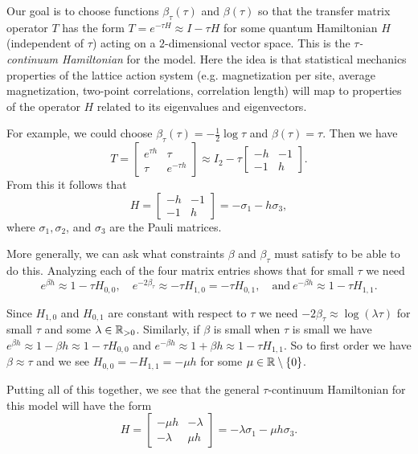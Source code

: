 \documentclass[11pt,reqno]{amsart}
\begin{document}
	Our goal is to choose functions $\beta_\tau(\tau)$ and $\beta(\tau)$ so that the transfer matrix operator $T$ has the form $T=e^{-\tau H} \approx I-\tau H$ for some quantum Hamiltonian $H$ (independent of $\tau$) acting on a $2$-dimensional vector space. 
	This is the \emph{$\tau$-continuum Hamiltonian} for the model. 
	Here the idea is that statistical mechanics properties of the lattice action system (e.g. magnetization per site, average magnetization, two-point correlations, correlation length) will map to properties of the operator $H$ related to its eigenvalues and eigenvectors.
	
	For example, we could choose $\beta_\tau(\tau)=-\frac{1}{2}\log \tau$ and $\beta(\tau)=\tau$. Then we have \[T=\begin{bmatrix}
	e^{\tau h} & \tau \\
	\tau & e^{-\tau h}
	\end{bmatrix} \approx I_2-\tau\begin{bmatrix}
	-h & -1 \\
	-1 & h
	\end{bmatrix}.\] 
	From this it follows that \[H=\begin{bmatrix}
	-h & -1 \\
	-1 & h
	\end{bmatrix}=-\sigma_1-h\sigma_3, \] where $\sigma_1,\sigma_2$, and $\sigma_3$ are the Pauli matrices. 
	
	More generally, we can ask what constraints $\beta$ and $\beta_\tau$ must satisfy to be able to do this. 
	Analyzing each of the four matrix entries shows that for small $\tau$ we need 
	\[e^{\beta h} \approx 1-\tau H_{0,0}, \quad e^{-2\beta_\tau} \approx -\tau H_{1,0}=-\tau H_{0,1},\quad \text{and} \ e^{-\beta h} \approx 1- \tau H_{1,1}. \]
	
	Since $H_{1,0}$ and $H_{0,1}$ are constant with respect to $\tau$ we need $-2\beta_\tau \approx \log (\lambda\tau)$ for small $\tau$ and some $\lambda\in \mathbb{R}_{>0}$. 
	Similarly, if $\beta$ is small when $\tau$ is small we have $e^{\beta h} \approx 1-\beta h \approx 1-\tau H_{0,0}$ and $e^{-\beta h} \approx 1+\beta h \approx 1-\tau H_{1,1}$. 
	So to first order we have $\beta \approx \tau$ and we see $H_{0,0}=-H_{1,1}=-\mu h$ for some $\mu \in \mathbb{R}\setminus\{0\}$. 
	
	Putting all of this together, we see that the general $\tau$-continuum Hamiltonian for this model will have the form 
	\[ H=\begin{bmatrix}
	-\mu h & -\lambda \\
	-\lambda & \mu h
	\end{bmatrix}=-\lambda\sigma_1-\mu h\sigma_3.\]
	
\end{document}
